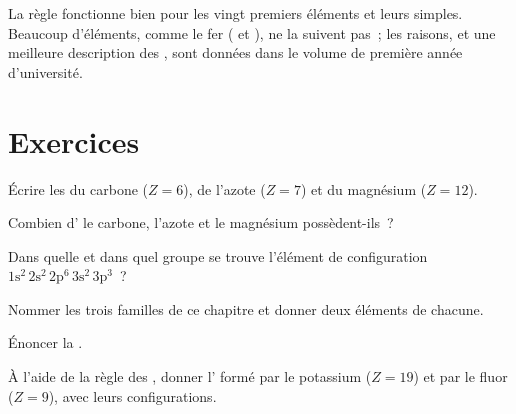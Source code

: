 \begin{remark}\label{rem:g10:electron-shells:limits}
La règle fonctionne bien pour les vingt premiers éléments et leurs 
simples. Beaucoup d'éléments, comme le fer ( et
), ne la suivent pas~; les raisons, et une meilleure
description des , sont données dans le volume de première
année d'université.
\end{remark}

\section{Exercices}

\begin{exercise}[$\star$]\label{exo:g10:electron-shells:1}
Écrire les  du carbone ($Z = 6$), de l'azote
($Z = 7$) et du magnésium ($Z = 12$).
\end{exercise}

\begin{exercise}[$\star$]\label{exo:g10:electron-shells:2}
Combien d' le carbone, l'azote et le magnésium
possèdent-ils~?
\end{exercise}

\begin{exercise}[$\star$]\label{exo:g10:electron-shells:3}
Dans quelle  et dans quel groupe se trouve l'élément de
configuration
$1\mathrm{s}^2\,2\mathrm{s}^2\,2\mathrm{p}^6\,3\mathrm{s}^2\,3\mathrm{p}^3$~?
\end{exercise}

\begin{exercise}[$\star$]\label{exo:g10:electron-shells:4}
Nommer les trois familles de ce chapitre et donner deux éléments de
chacune.
\end{exercise}

\begin{exercise}[$\star$]\label{exo:g10:electron-shells:5}
Énoncer la .
\end{exercise}

\begin{exercise}[$\star\star$]\label{exo:g10:electron-shells:6}
À l'aide de la règle des , donner l' formé par le potassium
($Z = 19$) et par le fluor ($Z = 9$), avec leurs configurations.
\end{exercise}

